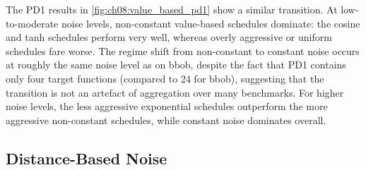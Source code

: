 The PD1 results in \cref{fig:ch08:value_based_pd1} show a similar transition. At low-to-moderate noise levels, non-constant value-based schedules dominate: the cosine and tanh schedules perform very well, whereas overly aggressive or uniform schedules fare worse. The regime shift from non-constant to constant noise occurs at roughly the same noise level as on \gls{bbob}, despite the fact that PD1 contains only four target functions (compared to 24 for \gls{bbob}), suggesting that the transition is not an artefact of aggregation over many benchmarks. For higher noise levels, the less aggressive exponential schedules outperform the more aggressive non-constant schedules, while constant noise dominates overall.

\subsection{Distance-Based Noise}
